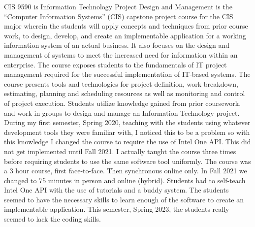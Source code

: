 
CIS 9590 is Information Technology Project Design and Management is the  ``Computer Information Systems'' (CIS) capstone project course for the CIS major wherein the students will apply concepts and techniques from prior course work, to design, develop, and create an implementable application for a working information system of an actual business. It also focuses on the design and management of systems to meet the increased need for information within an enterprise. The course exposes students to the fundamentals of IT project management required for the successful implementation of IT-based systems. The course presents tools and technologies for project definition, work breakdown, estimating, planning and scheduling resources as well as monitoring and control of project execution. Students utilize knowledge gained from prior coursework, and work in groups to design and manage an Information Technology project.  During my first semester, Spring 2020, teaching with the students using whatever development tools they were familiar with, I noticed this to be a problem so with this knowledge I changed the course to require the use of Intel One API.  This did not get implemented until Fall 2021.  I actually taught the course three times before requiring students to use the same software tool uniformly.  The course was a 3 hour course, first face-to-face.  Then synchronous online only.  In Fall 2021 we changed to 75 minutes in person and online (hybrid).  Students had to self-teach Intel One API with the use of tutorials and a buddy system.  The students seemed to have the necessary skills to learn enough of the software to create an implementable application.  This semester, Spring 2023, the students really seemed to lack the coding skills.
